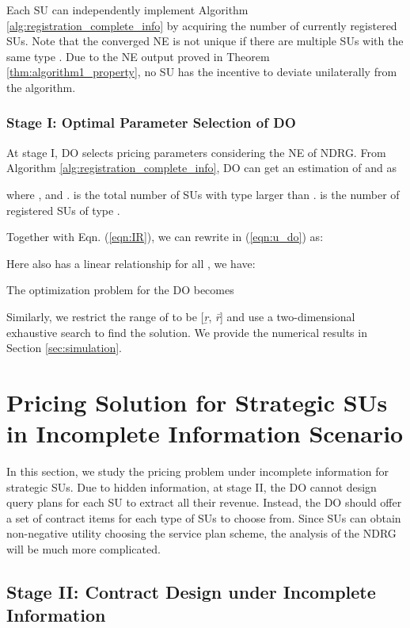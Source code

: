\documentclass[journal]{IEEEtran}
\begin{document}
Each SU can independently implement Algorithm \ref{alg:registration_complete_info} by acquiring the number of currently registered SUs. Note that the converged NE is not unique if there are multiple SUs with the same type . Due to the NE output proved in Theorem \ref{thm:algorithm1_property}, no SU has the incentive to deviate unilaterally from the algorithm.

\subsubsection{Stage I: Optimal Parameter Selection of DO}

At stage I, DO selects pricing parameters considering the NE of NDRG. From Algorithm \ref{alg:registration_complete_info}, DO can get an estimation of  and  as

where ,  and .
 is the total number of SUs with type larger than .  is the number of registered SUs of type .

Together with Eqn. (\ref{eqn:IR}), we can rewrite  in (\ref{eqn:u_do}) as:


Here  also has a linear relationship for all , we have:

The optimization problem for the DO becomes

Similarly, we restrict the range of  to be [\emph{\b{r}}, \emph{\={r}}] and use a two-dimensional exhaustive search to find the solution. We provide the numerical results in Section \ref{sec:simulation}.

\section{Pricing Solution for Strategic SUs in Incomplete Information Scenario}
\label{sec:strategic_incomplete}

In this section, we study the pricing problem under incomplete information for strategic SUs. Due to hidden information, at stage II, the DO cannot design query plans for each SU to extract all their revenue. Instead, the DO should offer a set of contract items for each type of SUs to choose from. Since SUs can obtain non-negative utility choosing the service plan scheme, the analysis of the NDRG will be much more complicated.

\subsection{Stage II: Contract Design under Incomplete Information}
\end{document}
